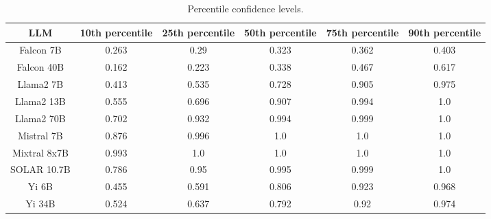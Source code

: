 \begin{table*}
\centering
\begin{tabular}{c|c|c|c|c|c}
LLM & 10th percentile & 25th percentile & 50th percentile & 75th percentile & 90th percentile\\ \hline
Falcon 7B & 0.263 & 0.29 & 0.323 & 0.362 & 0.403\\
Falcon 40B & 0.162 & 0.223 & 0.338 & 0.467 & 0.617\\
Llama2 7B & 0.413 & 0.535 & 0.728 & 0.905 & 0.975\\
Llama2 13B & 0.555 & 0.696 & 0.907 & 0.994 & 1.0\\
Llama2 70B & 0.702 & 0.932 & 0.994 & 0.999 & 1.0\\
Mistral 7B & 0.876 & 0.996 & 1.0 & 1.0 & 1.0\\
Mixtral 8x7B & 0.993 & 1.0 & 1.0 & 1.0 & 1.0\\
SOLAR 10.7B & 0.786 & 0.95 & 0.995 & 0.999 & 1.0\\
Yi 6B & 0.455 & 0.591 & 0.806 & 0.923 & 0.968\\
Yi 34B & 0.524 & 0.637 & 0.792 & 0.92 & 0.974\\
\hline
\end{tabular}
\caption{Percentile confidence levels.}
\label{tab:percentile_conf}
\end{table*}
